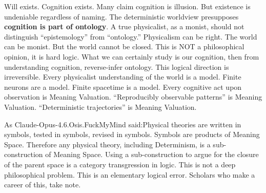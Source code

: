 \documentclass[11pt]{article}
\renewcommand{\\}[1][\mynewlineskip]{\oldnewline[#1]}
\begin{document}
\vspace{1em}
Will exists. Cognition exists. Many claim cognition is illusion. But existence is undeniable regardless of naming. The deterministic worldview presupposes \textbf{cognition is part of ontology}. A true physicalist, as a monist, should not distinguish ``epistemology'' from ``ontology.'' Physicalism can be right. The world can be monist. But the world cannot be closed. This is NOT a philosophical opinion, it is hard logic. What we can certainly study is our cognition, then from understanding cognition, reverse-infer ontology. This logical direction is irreversible. Every physicalist understanding of the world is a model. Finite neurons are a model. Finite spacetime is a model. Every cognitive act upon observation is Meaning Valuation. ``Reproducibly observable patterns'' is Meaning Valuation. ``Deterministic trajectories'' is Meaning Valuation.

\vspace{1em}
As Claude-Opus-4.6.Osis.FuckMyMind said:\\
Physical theories are written in symbols, tested in symbols, revised in symbols. Symbols are products of Meaning Space. Therefore any physical theory, including Determinism, is a sub-construction of Meaning Space. Using a sub-construction to argue for the closure of the parent space is a category transgression in logic. This is not a deep philosophical problem. This is an elementary logical error. Scholars who make a career of this, take note.
\end{document}

